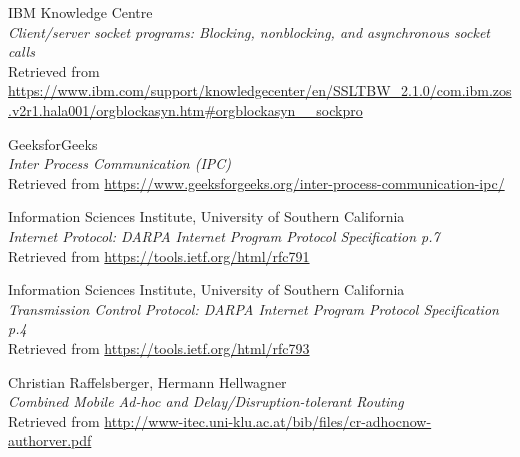 \documentclass[11pt]{article}
\begin{document}
\begin{thebibliography}{9}
\begin{flushleft}
	IBM Knowledge Centre \\
	\textit{Client/server socket programs: Blocking, nonblocking, and asynchronous socket calls} \\
	Retrieved from \url{https://www.ibm.com/support/knowledgecenter/en/SSLTBW_2.1.0/com.ibm.zos.v2r1.hala001/orgblockasyn.htm#orgblockasyn__sockpro}
\end{flushleft}

\begin{flushleft}
	GeeksforGeeks \\
	\textit{Inter Process Communication (IPC)} \\
	Retrieved from \url{https://www.geeksforgeeks.org/inter-process-communication-ipc/}
\end{flushleft}


\begin{flushleft}
	Information Sciences Institute, University of Southern California \\
	\textit{Internet Protocol: DARPA Internet Program Protocol Specification p.7} \\
	Retrieved from \url{https://tools.ietf.org/html/rfc791}
\end{flushleft}

\begin{flushleft}
	Information Sciences Institute, University of Southern California \\
	\textit{Transmission Control Protocol: DARPA Internet Program Protocol Specification p.4} \\
	Retrieved from \url{https://tools.ietf.org/html/rfc793}
\end{flushleft}

\begin{flushleft}
	Christian Raffelsberger, Hermann Hellwagner \\
	\textit{Combined Mobile Ad-hoc and Delay/Disruption-tolerant Routing} \\
	Retrieved from \url{http://www-itec.uni-klu.ac.at/bib/files/cr-adhocnow-authorver.pdf}
\end{flushleft}	



\end{thebibliography}
\end{document}
